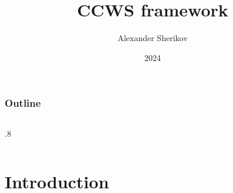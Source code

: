 \documentclass[hyperref={colorlinks=false, breaklinks=true},11pt]{beamer}
\title{CCWS framework}
\author{Alexander Sherikov}
\date{2024}
\begin{document}
\begin{frame}
    \titlepage
\end{frame}

\begin{frame}
    \frametitle{Outline}
    \begin{columns}[T]
        \begin{column}{.8\textwidth}
            \tableofcontents
        \end{column}
    \end{columns}
\end{frame}


\section{Introduction}
\end{document}
